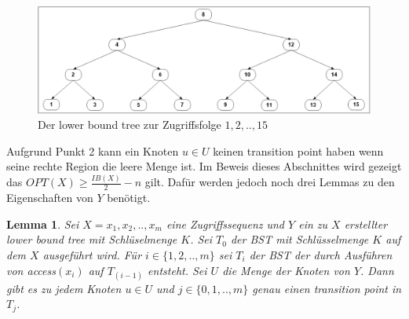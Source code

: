 \documentclass[a4paper,12pt]{article}
\begin{document}
 \begin{figure}[h]
 	\centering
 	\includegraphics[width=1\textwidth]{"Medien/Tango/lowerBoundTree"}
 	\caption{Der lower bound tree zur Zugriffsfolge $1 ,2, .., 15$  }
 	\label{fig:demlowerBoundTree}
 \end{figure}
Aufgrund Punkt 2 kann ein Knoten $u \in U$ keinen transition point haben wenn seine rechte Region die leere Menge ist. 
\noindent Im Beweis dieses Abschnittes wird gezeigt das $\mathit{OPT}\left(X\right) \geq \frac{\mathit{IB}\left(X\right)}{2} - n$ gilt. Dafür werden jedoch noch drei Lemmas zu den Eigenschaften von $Y$ benötigt. 
\newtheorem{Lemma4}{Lemma}[section] 
\begin{Lemma4} \label{demaineLemma1}
Sei $X = x_1,x_2,..,x_m$ eine Zugriffssequenz und $Y$ ein zu $X$ erstellter lower bound tree mit Schlüselmenge $K$. Sei $T_0$ der BST mit Schlüsselmenge $K$ auf dem $X$ ausgeführt wird. Für $i \in \{1,2,..,m\}$ sei $T_i$ der BST der durch Ausführen von \textit{access}$\left(x_i\right)$ auf $T_{\left(i-1\right)}$ entsteht. Sei $U$ die Menge der Knoten von $Y$. Dann gibt es zu jedem Knoten $u \in U$ und $j \in \{0,1,..,m\}$ genau einen transition point in $T_j$. 	
\end{Lemma4}
\end{document}
